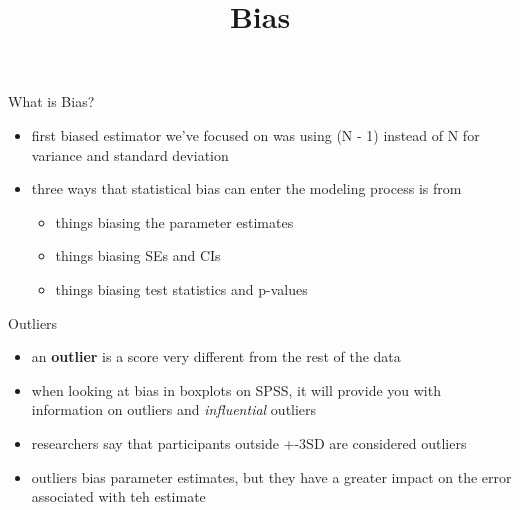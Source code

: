 \documentclass[
  ignorenonframetext,
]{beamer}
\title{Bias}
\author{}
\date{}
\begin{document}
\frame{\titlepage}

\begin{frame}{What is Bias?}
\protect\hypertarget{what-is-bias}{}
\begin{itemize}
\item
  first biased estimator we've focused on was using (N - 1) instead of N
  for variance and standard deviation
\item
  three ways that statistical bias can enter the modeling process is
  from

  \begin{itemize}
  \item
    things biasing the parameter estimates
  \item
    things biasing SEs and CIs
  \item
    things biasing test statistics and p-values
  \end{itemize}
\end{itemize}
\end{frame}

\begin{frame}{Outliers}
\protect\hypertarget{outliers}{}
\begin{itemize}
\item
  an \textbf{outlier} is a score very different from the rest of the
  data
\item
  when looking at bias in boxplots on SPSS, it will provide you with
  information on outliers and \emph{influential} outliers
\item
  researchers say that participants outside +-3SD are considered
  outliers
\item
  outliers bias parameter estimates, but they have a greater impact on
  the error associated with teh estimate
\end{itemize}
\end{frame}
\end{document}
